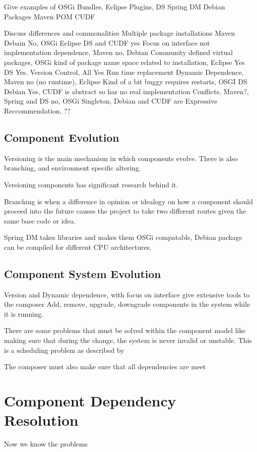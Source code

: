 \documentclass{report}
\begin{document}
Give examples of OSGi Bundles, Eclipse Plugins, DS
Spring DM
Debian Packages
Maven POM
CUDF

Discuss differences and commonalities
Multiple package installations Maven Debain No, OSGi Eclipse DS and CUDF yes
Focus on interface not implementation dependence, Maven no, Debian Community defined virtual packages, 
OSGi kind of package name space related to installation, Eclipse Yes DS Yes.
Version Control, All Yes
Run time replacement Dynamic Dependence, Maven no (no runtime), Eclipse Kind of a bit buggy requires restarts,
OSGI DS Debian Yes, CUDF is abstract so has no real implementation
Conflicts, Maven?, Spring and DS no,  OSGi Singleton, Debian and CUDF are Expressive
Reccommendation, ??

\section{Component Evolution}
Versioning is the main mechanism in which components evolve.
There is also branching, and environment specific altering.

Versioning components has significant research behind it.

Branching is when a difference in opinion or idealogy on how a component should proceed into the future
causes the project to take two different routes given the same base code or idea.

Spring DM takes libraries and makes them OSGi compatable, 
Debian package can be compiled for different CPU architectures.


\section{Component System Evolution}
Version and Dynamic dependence, with focus on interface give extensive tools to the composer 
Add, remove, upgrade, downgrade components in the system while it is running.

There are some problems that must be solved within the component model like making sure that during the change,
the system is never invalid or unstable. 
This is a scheduling problem as described by %

The composer must also make sure that all dependencies are meet 

\chapter{Component Dependency Resolution}
Now we know the problems
\end{document}
